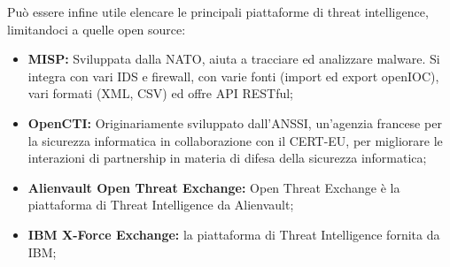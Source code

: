     Può essere infine utile elencare le principali piattaforme di threat intelligence, limitandoci a quelle open source:
    
    \begin{itemize}
        \item\textbf{MISP:} Sviluppata dalla NATO, aiuta a tracciare ed analizzare malware. Si integra con vari IDS e firewall, con varie fonti (import ed export openIOC), vari formati (XML, CSV) ed offre API RESTful;
        \item\textbf{OpenCTI:} Originariamente sviluppato dall'ANSSI, un'agenzia francese per la sicurezza informatica in collaborazione con il CERT-EU, per migliorare le interazioni di partnership in materia di difesa della sicurezza informatica;
        \item\textbf{Alienvault Open Threat Exchange:} Open Threat Exchange è la piattaforma di Threat Intelligence da Alienvault;
        \item\textbf{IBM X-Force Exchange:} la piattaforma di Threat Intelligence fornita da IBM;
    \end{itemize}